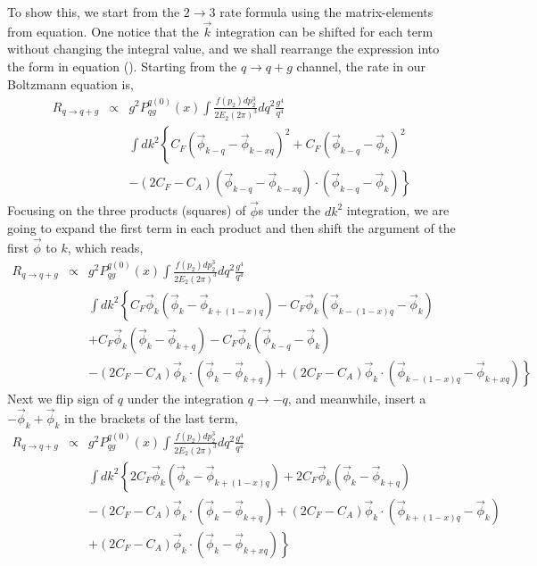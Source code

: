 To show this, we start from the $2\rightarrow 3$ rate formula using the matrix-elements from equation. 
One notice that the $\vec{k}$ integration can be shifted for each term without changing the integral value, and we shall rearrange the expression into the form in equation ().
Starting from the $q\rightarrow q+g$ channel, the rate in our Boltzmann equation is,
\begin{eqnarray}
R_{q\rightarrow q+g} &\propto& g^2 P_{qg}^{q(0)}(x) \int  \frac{f(p_2)dp_2^3}{2E_2(2\pi)^3} d q^2 \frac{g^4}{q^4}\\\nonumber
&&  \int d k^2\left\{
C_F\left( \vec{\phi}_{k-q}-\vec{\phi}_{k-xq} \right)^2
+ C_F\left( \vec{\phi}_{k-q}-\vec{\phi}_{k} \right)^2\right.\\\nonumber
&&\left.
- (2C_F-C_A)\left( \vec{\phi}_{k-q}-\vec{\phi}_{k-xq} \right)\cdot \left( \vec{\phi}_{k-q}-\vec{\phi}_{k} \right)
\right\}
\end{eqnarray}
Focusing on the three products (squares) of $\vec{\phi}$s under the $dk^2$ integration, we are going to expand the first term in each product and then shift the argument of the first $\vec{\phi}$ to $k$, which reads,
\begin{eqnarray}
R_{q\rightarrow q+g} &\propto& g^2 P_{qg}^{q(0)}(x) \int  \frac{f(p_2)dp_2^3}{2E_2(2\pi)^3} d q^2 \frac{g^4}{q^4}\\\nonumber
&&  \int d k^2\left\{
C_F\vec{\phi}_{k}\left( \vec{\phi}_{k}-\vec{\phi}_{k+(1-x)q} \right)
- C_F\vec{\phi}_{k}\left( \vec{\phi}_{k-(1-x)q}-\vec{\phi}_{k} \right)\right.
\\\nonumber
&&+ C_F\vec{\phi}_{k}\left( \vec{\phi}_{k}-\vec{\phi}_{k+q} \right)
- C_F\vec{\phi}_{k}\left( \vec{\phi}_{k-q}-\vec{\phi}_{k} \right)
\\\nonumber
&&\left.
- (2C_F-C_A)\vec{\phi}_{k}\cdot \left( \vec{\phi}_{k}-\vec{\phi}_{k+q} \right)
+(2C_F-C_A)\vec{\phi}_{k} \cdot \left( \vec{\phi}_{k-(1-x)q}-\vec{\phi}_{k+xq} \right)
\right\}
\end{eqnarray}
Next we flip sign of $q$ under the integration $q\rightarrow -q$,
and meanwhile, insert a $-\vec{\phi}_k +\vec{\phi}_k$ in the brackets of the last term,
\begin{eqnarray}
R_{q\rightarrow q+g} &\propto& g^2 P_{qg}^{q(0)}(x) \int  \frac{f(p_2)dp_2^3}{2E_2(2\pi)^3} d q^2 \frac{g^4}{q^4}\\\nonumber
&&  \int d k^2\left\{
2C_F\vec{\phi}_{k}\left( \vec{\phi}_{k}-\vec{\phi}_{k+(1-x)q} \right)
+ 2C_F\vec{\phi}_{k}\left( \vec{\phi}_{k}-\vec{\phi}_{k+q} \right)
\right.
\\\nonumber
&&
- (2C_F-C_A)\vec{\phi}_{k}\cdot \left( \vec{\phi}_{k}-\vec{\phi}_{k+q} \right)
+(2C_F-C_A)\vec{\phi}_{k} \cdot \left( \vec{\phi}_{k+(1-x)q} -\vec{\phi}_k \right) \\\nonumber
&&\left.+(2C_F-C_A)\vec{\phi}_{k} \cdot \left(\vec{\phi}_k-\vec{\phi}_{k+xq} \right)
\right\}
\end{eqnarray}
